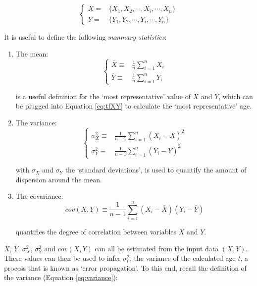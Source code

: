\documentclass{book}
\begin{document}
\begin{equation}
\left\{
\begin{array}{rl}
X = & \{X_1, X_2, \cdots, X_i, \cdots, X_n\} \\
Y = & \{Y_1, Y_2, \cdots, Y_i, \cdots, Y_n\}
\end{array}
\right.
\label{eq:XY}
\end{equation}

It is useful to define the following \emph{summary statistics}:

\begin{enumerate}
\item The mean:
\begin{equation}
\left\{
\begin{array}{rl}
\overline{X} \equiv & \frac{1}{n} \sum_{i=1}^{n} X_i\\
\overline{Y} \equiv & \frac{1}{n} \sum_{i=1}^{n} Y_i
\end{array}
\right.
\label{eq:mean}
\end{equation}

is a useful definition for the `most representative' value of $X$ and
$Y$, which can be plugged into Equation \ref{eq:tfXY} to calculate the
`most representative' age.

\item The variance:
\begin{equation}
\left\{
\begin{array}{rl}
\sigma^2_X \equiv & \frac{1}{n-1} \sum_{i=1}^{n} (X_i-\overline{X})^2\\
\sigma^2_Y \equiv & \frac{1}{n-1} \sum_{i=1}^{n} (Y_i-\overline{Y})^2
\end{array}
\right.
\label{eq:variance}
\end{equation}

with $\sigma_X$ and $\sigma_Y$ the `standard deviations', is used to
quantify the amount of dispersion around the mean.

\item The covariance:
\begin{equation}
cov(X,Y) \equiv \frac{1}{n-1} \sum_{i=1}^{n} (X_i-\overline{X})(Y_i-\overline{Y})
\label{eq:covariance}
\end{equation}

quantifies the degree of correlation between variables $X$ and $Y$.
\end{enumerate}

$\overline{X}$, $\overline{Y}$, $\sigma^2_{X}$, $\sigma^2_{Y}$ and
$cov(X,Y)$ can all be estimated from the input data $(X,Y)$. These
values can then be used to infer $\sigma^2_{t}$, the variance of the
calculated age $t$, a process that is known as `error propagation'. To
this end, recall the definition of the variance (Equation
\ref{eq:variance}):
\end{document}
